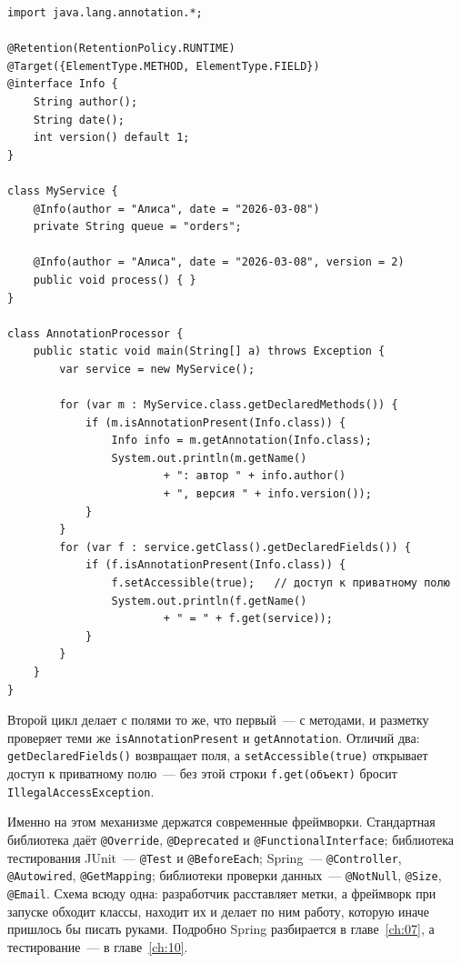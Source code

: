 \begin{listing}[H]
\begin{verbatim}
import java.lang.annotation.*;

@Retention(RetentionPolicy.RUNTIME)
@Target({ElementType.METHOD, ElementType.FIELD})
@interface Info {
    String author();
    String date();
    int version() default 1;
}

class MyService {
    @Info(author = "Алиса", date = "2026-03-08")
    private String queue = "orders";

    @Info(author = "Алиса", date = "2026-03-08", version = 2)
    public void process() { }
}

class AnnotationProcessor {
    public static void main(String[] a) throws Exception {
        var service = new MyService();

        for (var m : MyService.class.getDeclaredMethods()) {
            if (m.isAnnotationPresent(Info.class)) {
                Info info = m.getAnnotation(Info.class);
                System.out.println(m.getName()
                        + ": автор " + info.author()
                        + ", версия " + info.version());
            }
        }
        for (var f : service.getClass().getDeclaredFields()) {
            if (f.isAnnotationPresent(Info.class)) {
                f.setAccessible(true);   // доступ к приватному полю
                System.out.println(f.getName()
                        + " = " + f.get(service));
            }
        }
    }
}
\end{verbatim}
\caption{Собственная аннотация и её обработка через рефлексию}
\label{lst:02-12}
\end{listing}

Второй цикл делает с полями то же, что первый~--- с методами, и разметку
проверяет теми же \texttt{isAnnotationPresent} и \texttt{getAnnotation}.
Отличий два: \texttt{getDeclaredFields()} возвращает поля, а
\texttt{setAccessible(true)} открывает доступ к приватному полю~--- без этой
строки \texttt{f.get(объект)} бросит \texttt{IllegalAccessException}.

Именно на этом механизме держатся современные фреймворки. Стандартная
библиотека даёт \texttt{@Override}, \texttt{@Deprecated} и
\texttt{@FunctionalInterface}; библиотека тестирования JUnit~---
\texttt{@Test} и \texttt{@BeforeEach}; Spring~--- \texttt{@Controller},
\texttt{@Autowired}, \texttt{@GetMapping}; библиотеки проверки данных~---
\texttt{@NotNull}, \texttt{@Size}, \texttt{@Email}. Схема всюду одна:
разработчик расставляет метки, а фреймворк при запуске обходит классы,
находит их и делает по ним работу, которую иначе пришлось бы писать руками.
Подробно Spring разбирается в главе~\ref{ch:07}, а тестирование~--- в
главе~\ref{ch:10}.

